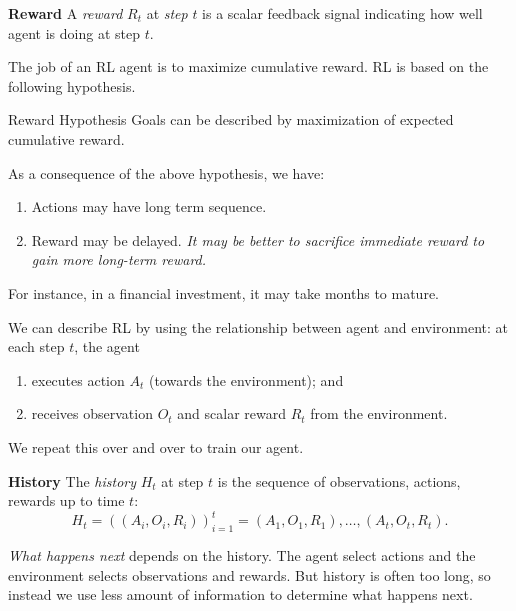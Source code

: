 \documentclass[RL]{subfile}
\begin{document}
    \begin{definition}{\textbf{Reward}}
        A \emph{reward} $R_t$ at \emph{step} $t$ is a scalar feedback signal indicating how well agent is doing at step $t$.
    \end{definition}

    \np The job of an RL agent is to maximize cumulative reward. RL is based on the following hypothesis.

    \begin{statement}{Reward Hypothesis}
        Goals can be described by maximization of expected cumulative reward.
    \end{statement}

    \rruleline

    \np As a consequence of the above hypothesis, we have:
    \begin{enumerate}
        \item Actions may have long term sequence.
        \item Reward may be delayed.
        \it It may be better to sacrifice immediate reward to gain more long-term reward.
    \end{enumerate}
    For instance, in a financial investment, it may take months to mature.

    \np We can describe RL by using the relationship between agent and environment: at each step $t$, the agent
    \begin{enumerate}
        \item executes action $A_t$ (towards the environment); and
        \item receives observation $O_t$ and scalar reward $R_t$ from the environment.
    \end{enumerate}
    We repeat this over and over to train our agent.

    \begin{definition}{\textbf{History}}
        The \emph{history} $H_t$ at step $t$ is the sequence of observations, actions, rewards up to time $t$:
        \begin{equation*}
            H_t = \left( \left( A_i,O_i,R_i \right) \right)^{t}_{i=1} = \left( A_1,O_1,R_1 \right),\ldots,\left( A_t,O_t,R_t \right).
        \end{equation*}
    \end{definition}

    \np \textit{What happens next} depends on the history. The agent select actions and the environment selects observations and rewards. But history is often too long, so instead we use less amount of information to determine what happens next.
\end{document}

